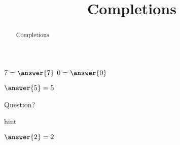 \documentclass{ximera}
\title{Completions}
\begin{document}
\begin{abstract}
  Completions
\end{abstract}
\maketitle

\begin{example}

  $7 = \answer{7}$
  $0 = \answer{0}$

  \begin{question}
    \begin{multipleChoice}
    \end{multipleChoice}
    
    \begin{feedback}[correct]
      $\answer{5} = 5$
    \end{feedback}
  \end{question}
  
  \begin{question}
    Question?

    \begin{hint}
      hint
    \end{hint}
    
    \begin{multipleChoice}
    \end{multipleChoice}

    \begin{feedback}[correct]
      $\answer{2} = 2$
    \end{feedback}
  \end{question}
\end{example}
\end{document}
